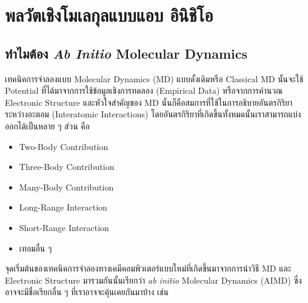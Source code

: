 

\chapter{พลวัตเชิงโมเลกุลแบบแอบ อินิชิโอ}
\label{ch:aimd}

\section{ทำไมต้อง \textit{Ab Initio} Molecular Dynamics}

เทคนิคการจำลองแบบ Molecular Dynamics (MD) แบบดั้งเดิมหรือ Classical MD นั้นจะใช้ Potential ที่ได้มาจากการใช้ข้อมูลเชิงการทดลอง
(Empirical Data) หรือจากการคำนวณ Electronic Structure และหัวใจสำคัญของ MD นั้นก็คือสมการที่ใช้ในการอธิบายอันตรกิริยาระหว่างอะตอม
(Interatomic Interactions) โดยอันตรกิริยาที่เกิดขึ้นทั้งหมดนั้นเราสามารถแบ่งออกได้เป็นหลาย ๆ ส่วน คือ

\begin{itemize}[topsep=0pt,noitemsep]
  \setlength\itemsep{1em}
  \item Two-Body Contribution

  \item Three-Body Contribution

  \item Many-Body Contribution

  \item Long-Range Interaction

  \item Short-Range Interaction

  \item เทอมอื่น ๆ
\end{itemize}

จุดเริ่มต้นของเทคนิคการจำลองทางเคมีคอมพิวเตอร์แบบใหม่ที่เกิดขึ้นมาจากการนำวิธี MD และ Electronic Structure มารวมกันนั้นเรียกว่า
\textit{ab initio} Molecular Dynamics (AIMD) ซึ่งอาจจะมีชื่อเรียกอื่น ๆ ที่เราอาจจะคุ้นเคยกันมาบ้าง เช่น

